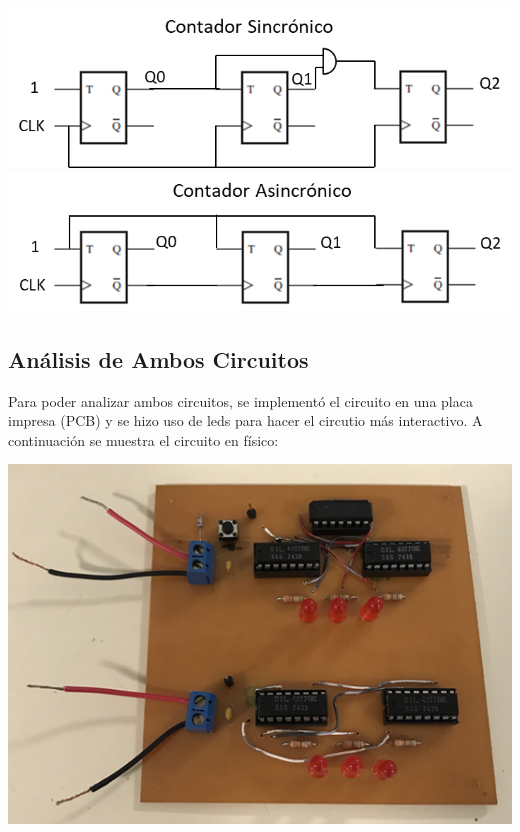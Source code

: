 \begin{center}
\includegraphics{../7-Async-Sync-Counter/contador sinc.png}
\includegraphics{../7-Async-Sync-Counter/contador asinc.png}
\end{center}

\subsection{Análisis de Ambos Circuitos}

Para poder analizar ambos circuitos, se implementó el circuito en una placa impresa (PCB) y se hizo uso de leds para hacer el circutio más interactivo.
A continuación se muestra el circuito en físico:

\begin{center}
\includegraphics{../7-Async-Sync-Counter/pcb.png}
\end{center}

